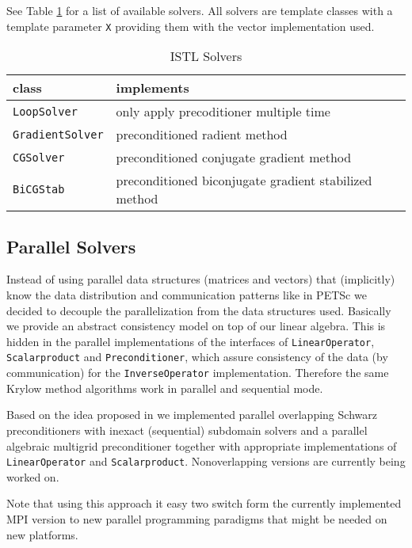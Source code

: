 \documentclass[11pt]{article}
\begin{document}
{See Table \ref{tab:solvers} for a list of available solvers. All
solvers are template classes with a template parameter \lstinline!X!
providing them with the vector implementation used.
\begin{table}[htb]
  \centering
  \caption{ISTL Solvers}
  \label{tab:solvers}
  \begin{tabular}{|l|l|}
\hline
    \textbf{class}&\textbf{implements}\\\hline\hline
    \lstinline!LoopSolver!& only apply precoditioner multiple time\\
    \lstinline!GradientSolver!& preconditioned radient method\\
    \lstinline!CGSolver!&preconditioned conjugate gradient method\\
    \lstinline!BiCGStab!&preconditioned biconjugate gradient stabilized method\\\hline
  \end{tabular}
\end{table}
\subsection{Parallel Solvers}
\label{sec:parallelism}

Instead of using parallel data structures (matrices and vectors) that
(implicitly) know the data distribution and communication patterns
like in PETSc \cite{petsc-web-page,petsc-user-ref} we decided to
decouple the parallelization from the data structures used. Basically
we provide an abstract consistency model on top of our linear
algebra. This is hidden in the parallel implementations of the interfaces
of \lstinline!LinearOperator!,
\lstinline!Scalarproduct! and \lstinline!Preconditioner!, which assure
consistency of the data (by communication) for the \lstinline!InverseOperator!
implementation. Therefore the same Krylow method algorithms work in
parallel and sequential mode. 

Based on the idea proposed in \cite{dddalg} we implemented parallel overlapping
Schwarz preconditioners with inexact (sequential) subdomain solvers and a
parallel algebraic multigrid preconditioner
together with appropriate implementations of
\lstinline!LinearOperator! and
\lstinline!Scalarproduct!. Nonoverlapping versions are currently being
worked on.

Note that using this approach it easy two switch form the currently
implemented MPI version to new parallel programming paradigms that
might be needed on new platforms.


}
\end{document}

